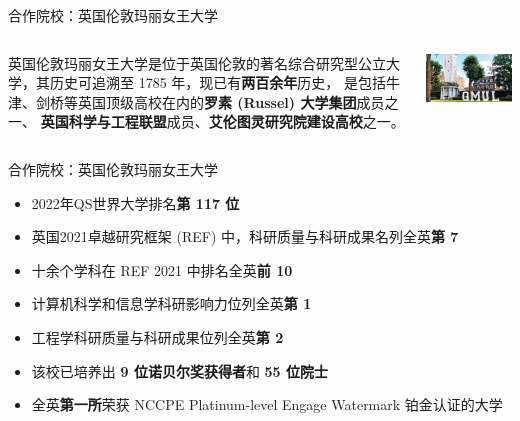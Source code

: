 \documentclass[aspectratio=169, utf8]{beamer}
\begin{document}
\begin{frame}{合作院校：英国伦敦玛丽女王大学}
    \begin{columns}
        \setlength{\parindent}{2em}

        英国伦敦玛丽女王大学是位于英国伦敦的著名综合研究型公立大学，其历史可追溯至 1785 年，现已有\textcolor{Fore}{\textbf{两百余年}}历史，
        是包括牛津、剑桥等英国顶级高校在内的\textcolor{Fore}{\textbf{罗素 (Russel) 大学集团}}成员之一、
        \textcolor{Fore}{\textbf{英国科学与工程联盟}}成员、\textcolor{Fore}{\textbf{艾伦图灵研究院建设高校}}之一。

        \includegraphics[width=\textwidth]{./resources/14.jpg}
    \end{columns}
\end{frame}

\begin{frame}{合作院校：英国伦敦玛丽女王大学}
    \begin{itemize}
        \item 2022年QS世界大学排名\textcolor{Fore}{\textbf{第 117 位}}
        \item 英国2021卓越研究框架 (REF) 中，科研质量与科研成果名列全英\textcolor{Fore}{\textbf{第 7}}
        \item 十余个学科在 REF 2021 中排名全英\textcolor{Fore}{\textbf{前 10}}
        \item 计算机科学和信息学科研影响力位列全英\textcolor{Fore}{\textbf{第 1}}
        \item 工程学科研质量与科研成果位列全英\textcolor{Fore}{\textbf{第 2}}
        \item 该校已培养出 \textcolor{Fore}{\textbf{9 位诺贝尔奖获得者}}和 \textcolor{Fore}{\textbf{55 位院士}}
        \item 全英\textcolor{Fore}{\textbf{第一所}}荣获 NCCPE Platinum-level Engage Watermark 铂金认证的大学
    \end{itemize}
\end{frame}
\end{document}
